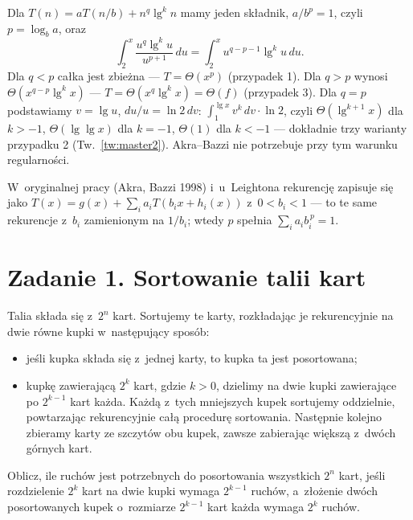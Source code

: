 \documentclass[11pt]{article}
\begin{document}
\begin{fakt}
Dla $T(n)=aT(n/b)+n^{q}\lg^kn$ mamy jeden składnik, $a/b^p=1$, czyli $p=\log_ba$, oraz
\[
\int_2^x\frac{u^q\lg^ku}{u^{p+1}}\,du=\int_2^xu^{q-p-1}\lg^ku\,du.
\]
Dla $q<p$ całka jest zbieżna --- $T=\Theta(x^p)$ (przypadek 1). Dla $q>p$ wynosi
$\Theta(x^{q-p}\lg^kx)$ --- $T=\Theta(x^q\lg^kx)=\Theta(f)$ (przypadek 3).
Dla $q=p$ podstawiamy $v=\lg u$, $du/u=\ln2\,dv$:
$\int_1^{\lg x}v^k\,dv\cdot\ln 2$, czyli $\Theta(\lg^{k+1}x)$ dla $k>-1$,
$\Theta(\lg\lg x)$ dla $k=-1$, $\Theta(1)$ dla $k<-1$ --- dokładnie trzy warianty
przypadku 2 (Tw.~\ref{tw:master2}). Akra--Bazzi nie potrzebuje przy tym
warunku regularności.
\end{fakt}

\begin{uwaga}
W~oryginalnej pracy (Akra, Bazzi 1998) i~u~Leightona rekurencję zapisuje się
jako $T(x)=g(x)+\sum_ia_iT(b_ix+h_i(x))$ z~$0<b_i<1$ --- to te same
rekurencje z~$b_i$ zamienionym na $1/b_i$; wtedy $p$ spełnia
$\sum_ia_ib_i^{\,p}=1$.
\end{uwaga}


\section{Zadanie 1. Sortowanie talii kart}
\begin{tresc}
Talia składa się z~$2^n$ kart. Sortujemy te karty, rozkładając je rekurencyjnie
na dwie równe kupki w~następujący sposób:
\begin{itemize}
\item jeśli kupka składa się z~jednej karty, to kupka ta jest posortowana;
\item kupkę zawierającą $2^k$ kart, gdzie $k>0$, dzielimy na dwie kupki
zawierające po $2^{k-1}$ kart każda. Każdą z~tych mniejszych kupek sortujemy
oddzielnie, powtarzając rekurencyjnie całą procedurę sortowania. Następnie
kolejno zbieramy karty ze szczytów obu kupek, zawsze zabierając większą
z~dwóch górnych kart.
\end{itemize}
Oblicz, ile ruchów jest potrzebnych do posortowania wszystkich $2^n$ kart,
jeśli rozdzielenie $2^k$ kart na dwie kupki wymaga $2^{k-1}$ ruchów, a~złożenie
dwóch posortowanych kupek o~rozmiarze $2^{k-1}$ kart każda wymaga $2^k$ ruchów.
\end{tresc}
\end{document}
